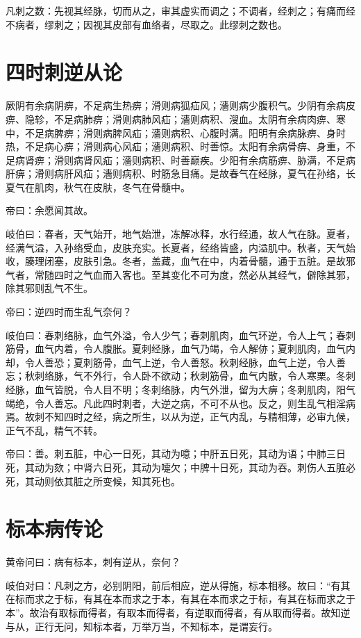 \documentclass{article}%
\begin{document}
凡刺之数：先视其经脉，切而从之，审其虚实而调之；不调者，经刺之；有痛而经不病者，缪刺之；因视其皮部有血络者，尽取之。此缪刺之数也。
\section{四时刺逆从论}
厥阴有余病阴痹，不足病生热痹；滑则病狐疝风；濇则病少腹积气。少阴有余病皮痹、隐轸，不足病肺痹；滑则病肺风疝；濇则病积、溲血。太阴有余病肉痹、寒中，不足病脾痹；滑则病脾风疝；濇则病积、心腹时满。阳明有余病脉痹、身时热，不足病心痹；滑则病心风疝；濇则病积、时善惊。太阳有余病骨痹、身重，不足病肾痹；滑则病肾风疝；濇则病积、时善巅疾。少阳有余病筋痹、胁满，不足病肝痹；滑则病肝风疝；濇则病积、时筋急目痛。是故春气在经脉，夏气在孙络，长夏气在肌肉，秋气在皮肤，冬气在骨髓中。

帝曰：余愿闻其故。

岐伯曰：春者，天气始开，地气始泄，冻解冰释，水行经通，故人气在脉。夏者，经满气溢，入孙络受血，皮肤充实。长夏者，经络皆盛，内溢肌中。秋者，天气始收，腠理闭塞，皮肤引急。冬者，盖藏，血气在中，内着骨髓，通于五脏。是故邪气者，常随四时之气血而入客也。至其变化不可为度，然必从其经气，僻除其邪，除其邪则乱气不生。

帝曰：逆四时而生乱气奈何？

岐伯曰：春刺络脉，血气外溢，令人少气；春刺肌肉，血气环逆，令人上气；春刺筋骨，血气内着，令人腹胀。夏刺经脉，血气乃竭，令人解㑊；夏刺肌肉，血气内却，令人善恐；夏刺筋骨，血气上逆，令人善怒。秋刺经脉，血气上逆，令人善忘；秋刺络脉，气不外行，令人卧不欲动；秋刺筋骨，血气内散，令人寒栗。冬刺经脉，血气皆脱，令人目不明；冬刺络脉，内气外泄，留为大痹；冬刺肌肉，阳气竭绝，令人善忘。凡此四时刺者，大逆之病，不可不从也。反之，则生乱气相淫病焉。故刺不知四时之经，病之所生，以从为逆，正气内乱，与精相薄，必审九候，正气不乱，精气不转。

帝曰：善。刺五脏，中心一日死，其动为噫；中肝五日死，其动为语；中肺三日死，其动为欬；中肾六日死，其动为嚏欠；中脾十日死，其动为吞。刺伤人五脏必死，其动则依其脏之所变候，知其死也。
\section{标本病传论}
黄帝问曰：病有标本，刺有逆从，奈何？

岐伯对曰：凡刺之方，必别阴阳，前后相应，逆从得施，标本相移。故曰：“有其在标而求之于标，有其在本而求之于本，有其在本而求之于标，有其在标而求之于本”。故治有取标而得者，有取本而得者，有逆取而得者，有从取而得者。故知逆与从，正行无问，知标本者，万举万当，不知标本，是谓妄行。
\end{document}

